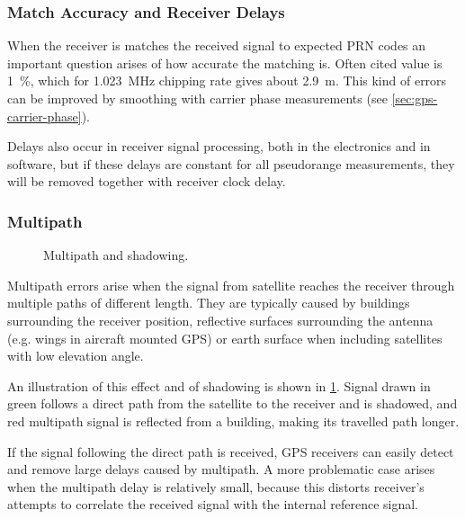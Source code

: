 
\subsubsection{Match Accuracy and Receiver Delays}

When the receiver is matches the received signal to expected PRN codes an 
important question arises of how accurate the matching is.
Often cited value is \SI{1}{\percent}, which for \SI{1.023}{\mega\hertz}
chipping rate gives about \SI{2.9}{\meter}.
This kind of errors can be improved by smoothing with carrier phase measurements (see
\cref{sec:gps-carrier-phase}).

Delays also occur in receiver signal processing, both in the electronics and in software,
but if these delays are constant for all pseudorange measurements, they will be removed
together with receiver clock delay.

\subsubsection{Multipath}

\begin{figure}[t]
	\centering
	
	\caption{Multipath and shadowing.}
	\label{fig:multipath}
\end{figure}

Multipath errors arise when the signal from satellite reaches the receiver
through multiple paths of different length.
They are typically caused by buildings surrounding the receiver position,
reflective surfaces surrounding the antenna (e.g. wings in aircraft mounted GPS) or earth surface
when including satellites with low elevation angle.

An illustration of this effect and of shadowing is shown in \cref{fig:multipath}.
Signal drawn in green follows a direct path from the satellite to the receiver and is shadowed,
and red multipath signal is reflected from a building, making its travelled path longer.

If the signal following the direct path is received, GPS receivers can easily detect and remove large delays caused by multipath.
A more problematic case arises when the multipath delay is relatively small, because this distorts
receiver's attempts to correlate the received signal with the internal reference signal.

